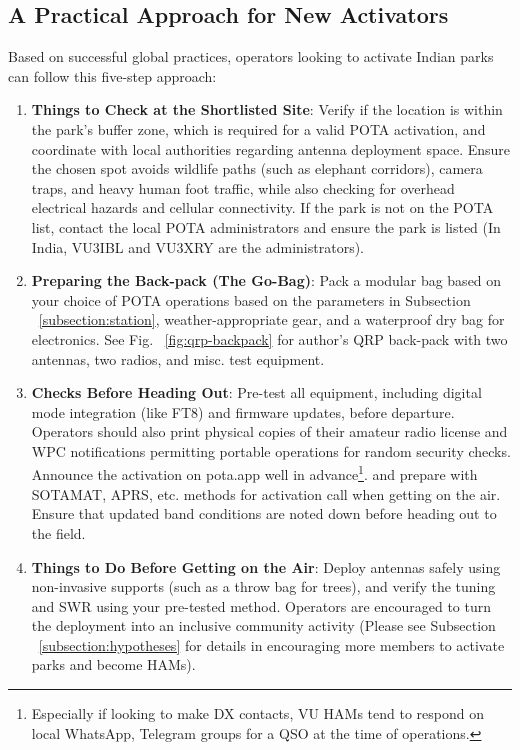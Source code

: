 \documentclass[conference]{IEEEtran}
\begin{document}
\subsection{A Practical Approach for New Activators}
Based on successful global practices, operators looking to activate
Indian parks can follow this five-step approach\cite{b16}:
\begin{enumerate}
\item \textbf{Things to Check at the Shortlisted Site}: Verify if the
  location is within the park's buffer zone, which is required for a
  valid POTA activation, and coordinate with local authorities
  regarding antenna deployment space. Ensure the chosen spot
  avoids wildlife paths (such as elephant corridors), camera traps,
  and heavy human foot traffic, while also checking for overhead
  electrical hazards and cellular connectivity. If the park is not on
  the POTA list, contact the local POTA administrators and ensure the
  park is listed (In India, VU3IBL and VU3XRY are the administrators).
\item \textbf{Preparing the Back-pack (The Go-Bag)}: Pack a modular
  bag based on your choice of POTA operations based on the parameters
  in Subsection ~\ref{subsection:station}, weather-appropriate gear,
  and a waterproof dry bag for electronics. See Fig.
  ~\ref{fig:qrp-backpack} for author's QRP back-pack with two
  antennas, two radios, and misc. test equipment.
\item \textbf{Checks Before Heading Out}: Pre-test all equipment,
  including digital mode integration (like FT8) and firmware updates,
  before departure. Operators should also print physical copies of
  their amateur radio license and WPC notifications permitting
  portable operations for random security checks. Announce the
  activation on pota.app well in advance\footnote{Especially if
    looking to make DX contacts, VU HAMs tend to respond on local
    WhatsApp, Telegram groups for a QSO at the time of operations.}.
  and prepare with SOTAMAT, APRS, etc. methods for activation call
  when getting on the air. Ensure that updated band conditions are
  noted down before heading out to the field.
\item \textbf{Things to Do Before Getting on the Air}: Deploy antennas
  safely using non-invasive supports (such as a throw bag for trees),
  and verify the tuning and SWR using your pre-tested method. Operators are
  encouraged to turn the deployment into an inclusive community
  activity (Please see Subsection ~\ref{subsection:hypotheses} for
  details in encouraging more members to activate parks and become HAMs).

\end{enumerate}
\end{document}
